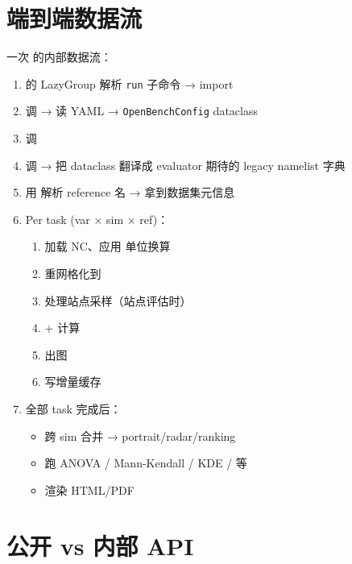 \section{端到端数据流}

一次  的内部数据流：

\begin{enumerate}
  \item {} 的 LazyGroup 解析 \texttt{run} 子命令 → import 
  \item {} 调  → 读 YAML → \texttt{OpenBenchConfig} dataclass
  \item {} 调 
  \item {} 调  → 把 dataclass 翻译成 evaluator 期待的 legacy namelist 字典
  \item {} 用  解析 reference 名 → 拿到数据集元信息
  \item Per task (var × sim × ref)：
    \begin{enumerate}
      \item {} 加载 NC、应用  单位换算
      \item {} 重网格化到 
      \item {} 处理站点采样（站点评估时）
      \item {} +  计算
      \item {} 出图
      \item {} 写增量缓存
    \end{enumerate}
  \item 全部 task 完成后：
    \begin{itemize}
      \item {} 跨 sim 合并 → portrait/radar/ranking
      \item {} 跑 ANOVA / Mann-Kendall / KDE / 等
      \item {} 渲染 HTML/PDF
    \end{itemize}
\end{enumerate}

\section{公开 vs 内部 API}

